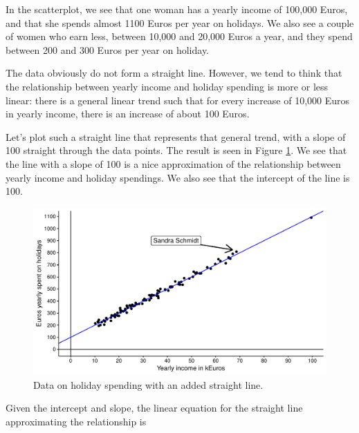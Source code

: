 \documentclass[]{book}\usepackage[]{graphicx}\usepackage[]{color}
\makeatletter
\def\maxwidth{ %
  \ifdim\Gin@nat@width>\linewidth
    \linewidth
  \else
    \Gin@nat@width
  \fi
}
\newenvironment{knitrout}{}{} %
\makeatother
\begin{document}
In the scatterplot, we see that one woman has a yearly income of 100,000 Euros, and that she spends almost 1100 Euros per year on holidays. We also see a couple of women who earn less, between 10,000 and 20,000 Euros a year, and they spend between 200 and 300 Euros per year on holiday.

The data obviously do not form a straight line. However, we tend to think that the relationship between yearly income and holiday spending is more or less linear: there is a general linear trend such that for every increase of 10,000 Euros in yearly income, there is an increase of about 100 Euros.

Let's plot such a straight line that represents that general trend, with a slope of 100 straight through the data points. The result is seen in Figure \ref{fig:lm_9}. We see that the line with a slope of 100 is a nice approximation of the relationship between yearly income and holiday spendings. We also see that the intercept of the line is 100.

\begin{knitrout}
\color{fgcolor}\begin{figure}

{\centering \includegraphics[width=\maxwidth]{figure/lm_9-1} 

}

\caption[Data on holiday spending with an added straight line]{Data on holiday spending with an added straight line.}\label{fig:lm_9}
\end{figure}


\end{knitrout}

Given the intercept and slope, the linear equation for the straight line approximating the relationship is
\end{document}

